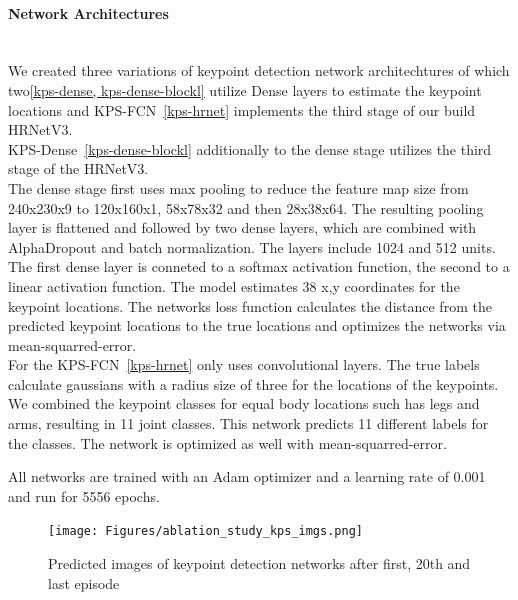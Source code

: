 \paragraph{Network Architectures}\mbox{}\\
We created three variations of keypoint detection network architechtures of which two\ref{kps-dense, kps-dense-blockl}
utilize Dense layers to estimate the keypoint locations and KPS-FCN~\ref{kps-hrnet} implements the third stage of our
build HRNetV3.\\
KPS-Dense~\ref{kps-dense-blockl} additionally to the dense stage utilizes the third stage of the HRNetV3.\\
The dense stage first uses max pooling to reduce the feature map size from 240x230x9 to 120x160x1, 58x78x32 and then 28x38x64.
The resulting pooling layer is flattened and followed by two dense layers, which are combined with AlphaDropout and
batch normalization. The layers include 1024 and 512 units. The first dense layer is conneted to a softmax activation function,
the second to a linear activation function. The model estimates 38 x,y coordinates for the keypoint locations.
The networks loss function calculates the distance from the predicted keypoint locations to the true locations and optimizes
the networks via mean-squarred-error.\\
For the KPS-FCN~\ref{kps-hrnet} only uses convolutional layers.
The true labels calculate gaussians with a radius size of three for the locations of the keypoints.
We combined the keypoint classes for equal body locations such has legs and arms, resulting in 11 joint classes.
This network predicts 11 different labels for the classes. The network is optimized as well with mean-squarred-error.

All networks are trained with an Adam optimizer and a learning rate of 0.001 and run for 5556 epochs.

\begin{figure}[H]
    \centering
    \texttt{[image: Figures/ablation\_study\_kps\_imgs.png]}
    \decoRule
    \caption[Ablation Keypoints Detection Module: Predicted Training Images]{Predicted images of keypoint detection networks
    after first, 20th and last episode}
    \label{fig:kps-train-imgs}
\end{figure}

